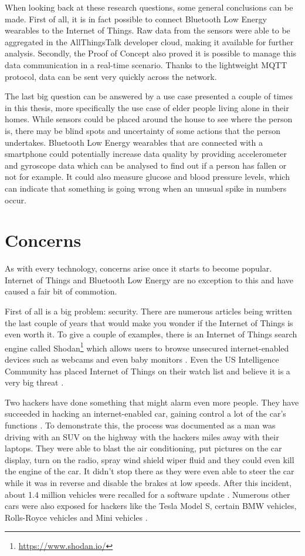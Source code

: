 \documentclass[pdftex,a4paper,12pt,twoside]{report}
\begin{document}
When looking back at these research questions, some general conclusions can be made. First of all, it is in fact possible to connect Bluetooth Low Energy wearables to the Internet of Things. Raw data from the sensors were able to be aggregated in the AllThingsTalk developer cloud, making it available for further analysis. Secondly, the Proof of Concept also proved it is possible to manage this data communication in a real-time scenario. Thanks to the lightweight MQTT protocol, data can be sent very quickly across the network.

The last big question can be answered by a use case presented a couple of times in this thesis, more specifically the use case of elder people living alone in their homes. While sensors could be placed around the house to see where the person is, there may be blind spots and uncertainty of some actions that the person undertakes. Bluetooth Low Energy wearables that are connected with a smartphone could potentially increase data quality by providing accelerometer and gyroscope data which can be analysed to find out if a person has fallen or not for example. It could also measure glucose and blood pressure levels, which can indicate that something is going wrong when an unusual spike in numbers occur.

\section{Concerns}
\label{sec:concerns}

As with every technology, concerns arise once it starts to become popular. Internet of Things and Bluetooth Low Energy are no exception to this and have caused a fair bit of commotion.

First of all is a big problem: security. There are numerous articles being written the last couple of years that would make you wonder if the Internet of Things is even worth it. To give a couple of examples, there is an Internet of Things search engine called Shodan\footnote{\url{https://www.shodan.io/}} which allows users to browse unsecured internet-enabled devices such as webcams and even baby monitors \citep{porup20162, stanislav2015}. Even the US Intelligence Community has placed Internet of Things on their watch list and believe it is a very big threat \citep{clapper2016}.

Two hackers have done something that might alarm even more people. They have succeeded in hacking an internet-enabled car, gaining control a lot of the car's functions \citep{greenberg2015}. To demonstrate this, the process was documented as a man was driving with an SUV on the highway with the hackers miles away with their laptops. They were able to blast the air conditioning, put pictures on the car display, turn on the radio, spray wind shield wiper fluid and they could even kill the engine of the car. It didn't stop there as they were even able to steer the car while it was in reverse and disable the brakes at low speeds. After this incident, about 1.4 million vehicles were recalled for a software update \citep{kessler2015}. Numerous other cars were also exposed for hackers like the Tesla Model S, certain BMW vehicles, Rolls-Royce vehicles and Mini vehicles \citep{hirsch2015}.
\end{document}
